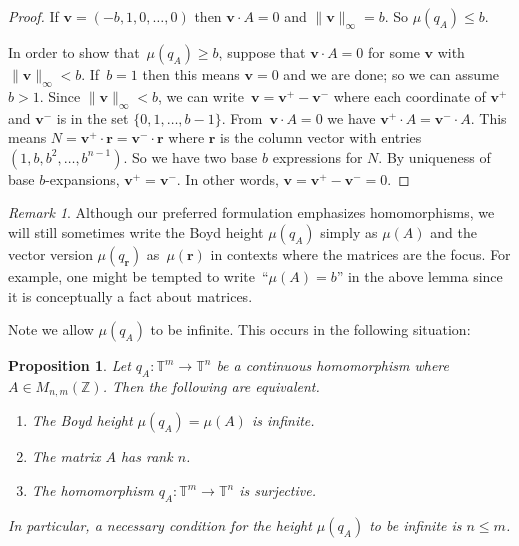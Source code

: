 \documentclass[12pt]{amsart}
\theoremstyle{plain}
\newtheorem{proposition}[theorem]{Proposition}
\theoremstyle{definition}
\theoremstyle{remark}
\newtheorem{remark}[theorem]{Remark}
\numberwithin{theorem}{section}
\numberwithin{equation}{section} %
\newcommand{\bZ}{{\mathbb{Z}}}
\newcommand{\mb}{\mathbf}
\newcommand{\torus}{{\mathbb{T}}}
\begin{document}
\begin{proof}
If $\mb v = (-b, 1, 0, \ldots, 0)$ then $\mb v \cdot A = 0$ and $\| \mb v \|_\infty = b$. So $\mu\left(q_{A}\right)  \le b$. 

In order to show that~$\mu\left(q_{A}\right)  \ge b$, suppose
  that $\mb v \cdot A = 0$ for some $\mb v$ with $\| \mb v \|_\infty < b$.
 If~$b = 1$ then this means $\mb v = 0$ and we are done; so we can assume $b > 1$.
Since $\|\mb v\|_\infty < b$, we can write~$\mb v = \mb v^+ - \mb v^{-}$ where each coordinate
of  $ \mb v^+$ and $ \mb v^-$ is in the set $\{ 0, 1, \ldots, b-1\}$. 
From~$\mb v \cdot A = 0$ we have  $\mb v^+ \cdot A = \mb v^- \cdot A$. This means $N = \mb v^+ \cdot \mb r = \mb v^- \cdot \mb r$ where $\mb r$ is the column vector with entries $(1, b, b^2, \ldots, b^{n-1})$.
So we have two base $b$ expressions for $N$. 
By uniqueness of base $b$-expansions, $\mb v^+  = \mb v^-$. In other words, $\mb v = \mb v^+ - \mb v^{-} = 0$.
\end{proof}

\begin{remark}
Although our preferred formulation emphasizes homomorphisms, 
we will still sometimes write the Boyd height $\mu\left(q_A\right)$ simply as $\mu(A)$ and 
the vector version $\mu\left( q_{\mb r}\right)$ as~$\mu(\mb r)$ in contexts where the matrices are the focus. 
For example, one might be tempted to 
write~``$\mu(A) = b$''
in the above lemma since it is conceptually a fact about matrices.
\end{remark}

Note we allow $\mu\left( q_A \right)$ to be infinite. This occurs in the following situation:

\begin{proposition} \label{infinite_height_lemma}
Let $q_A \colon \torus^m \to \torus^n$ be a continuous homomorphism where~$A \in M_{n, m}(\bZ)$.
Then the following are equivalent.
\begin{enumerate}
\item
The Boyd height $\mu\left( q_A \right) = \mu(A)$ is infinite.
\item
The matrix $A$ has rank $n$.
\item
The homomorphism $q_A \colon \torus^m \to \torus^n$ is surjective.
\end{enumerate}
In particular, a necessary condition for the height $\mu\left( q_A \right)$ to be infinite is $n \le m$.
\end{proposition}
\end{document}
